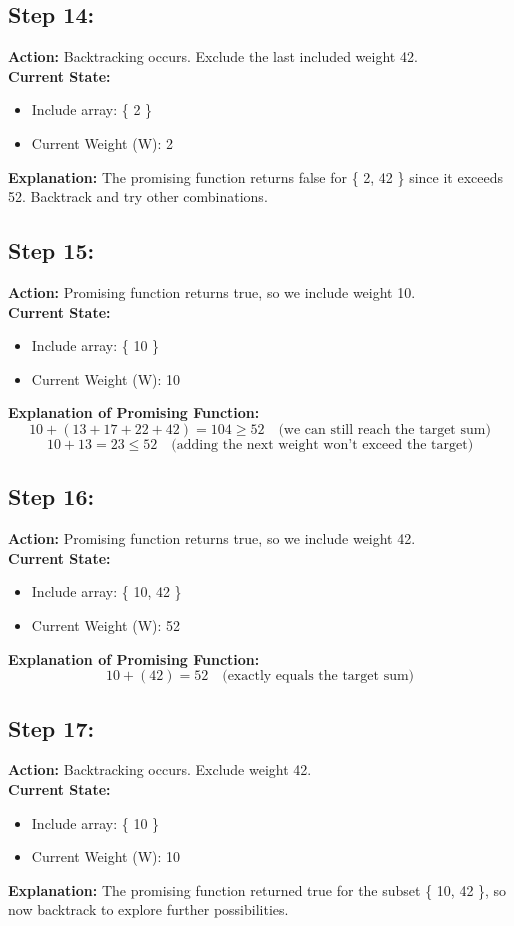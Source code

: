 \documentclass[12pt]{article}
\begin{document}
\subsection*{Step 14:}
\textbf{Action:} Backtracking occurs. Exclude the last included weight 42. \\
\textbf{Current State:} 
\begin{itemize}
    \item Include array: \{ 2 \}
    \item Current Weight (W): 2
\end{itemize}
\textbf{Explanation:} The promising function returns false for \{ 2, 42 \} since it exceeds 52. Backtrack and try other combinations.

\subsection*{Step 15:}
\textbf{Action:} Promising function returns true, so we include weight 10. \\
\textbf{Current State:} 
\begin{itemize}
    \item Include array: \{ 10 \}
    \item Current Weight (W): 10
\end{itemize}
\textbf{Explanation of Promising Function:}
\[
10 + (13 + 17 + 22 + 42) = 104 \geq 52 \quad \text{(we can still reach the target sum)}
\]
\[
10 + 13 = 23 \leq 52 \quad \text{(adding the next weight won't exceed the target)}
\]

\subsection*{Step 16:}
\textbf{Action:} Promising function returns true, so we include weight 42. \\
\textbf{Current State:} 
\begin{itemize}
    \item Include array: \{ 10, 42 \}
    \item Current Weight (W): 52
\end{itemize}
\textbf{Explanation of Promising Function:}
\[
10 + (42) = 52 \quad \text{(exactly equals the target sum)}
\]

\subsection*{Step 17:}
\textbf{Action:} Backtracking occurs. Exclude weight 42. \\
\textbf{Current State:} 
\begin{itemize}
    \item Include array: \{ 10 \}
    \item Current Weight (W): 10
\end{itemize}
\textbf{Explanation:} The promising function returned true for the subset \{ 10, 42 \}, so now backtrack to explore further possibilities.
\end{document}
